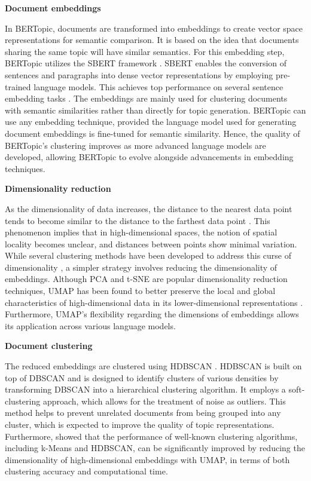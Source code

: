 \documentclass{article}
\begin{document}
\textbf{Document embeddings}

In BERTopic, documents are transformed into embeddings to create vector space representations for semantic comparison. It is based on the idea that documents sharing the same topic will have similar semantics. For this embedding step, BERTopic utilizes the SBERT framework \cite{reimers_sentence-bert_2019}. SBERT enables the conversion of sentences and paragraphs into dense vector representations by employing pre-trained language models. This achieves top performance on several sentence embedding tasks \cite{reimers_making_2020}. The embeddings are mainly used for clustering documents with semantic similarities rather than directly for topic generation. BERTopic can use any embedding technique, provided the language model used for generating document embeddings is fine-tuned for semantic similarity. Hence, the quality of BERTopic's clustering improves as more advanced language models are developed, allowing BERTopic to evolve alongside advancements in embedding techniques.

\textbf{Dimensionality reduction}

As the dimensionality of data increases, the distance to the nearest data point tends to become similar to the distance to the farthest data point \cite{aggarwal_surprising_2001, beyer_when_1999}. This phenomenon implies that in high-dimensional spaces, the notion of spatial locality becomes unclear, and distances between points show minimal variation. While several clustering methods have been developed to address this curse of dimensionality \cite{pandove_systematic_2018, steinbach_challenges_2004}, a simpler strategy involves reducing the dimensionality of embeddings. Although PCA and t-SNE are popular dimensionality reduction techniques, UMAP has been found to better preserve the local and global characteristics of high-dimensional data in its lower-dimensional representations \cite{mcinnes_umap_2020}. Furthermore, UMAP's flexibility regarding the dimensions of embeddings allows its application across various language models.

\textbf{Document clustering}

The reduced embeddings are clustered using HDBSCAN \cite{mcinnes_hdbscan_2017}. HDBSCAN is built on top of DBSCAN and is designed to identify clusters of various densities by transforming DBSCAN into a hierarchical clustering algorithm. It employs a soft-clustering approach, which allows for the treatment of noise as outliers. This method helps to prevent unrelated documents from being grouped into any cluster, which is expected to improve the quality of topic representations. Furthermore, \citet{allaoui_considerably_2020} showed that the performance of well-known clustering algorithms, including k-Means and HDBSCAN, can be significantly improved by reducing the dimensionality of high-dimensional embeddings with UMAP, in terms of both clustering accuracy and computational time.
\end{document}
